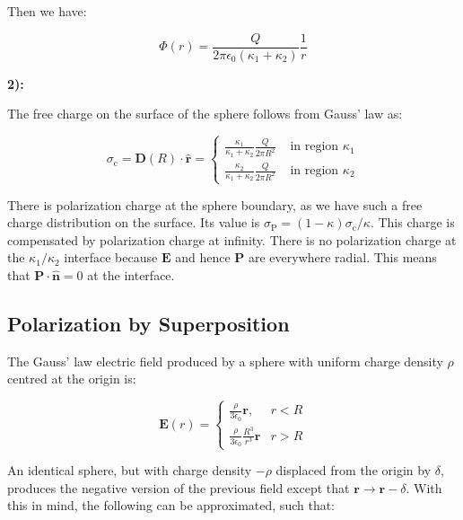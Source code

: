 Then we have:

\begin{equation}
	\Phi(r)=\frac{Q}{2 \pi \epsilon_{0}\left(\kappa_{1}+\kappa_{2}\right)} \frac{1}{r}
\end{equation}

\textbf{2):}

The free charge on the surface of the sphere follows from Gauss' law as:

\begin{equation}
	\sigma_{\mathrm{c}}=\mathbf{D}(R) \cdot \hat{\mathbf{r}}=\left\{\begin{array}{ll}
	\frac{\kappa_{1}}{\kappa_{1}+\kappa_{2}} \frac{Q}{2 \pi R^{2}} & \text { in region } \kappa_{1} \\
	\frac{\kappa_{2}}{\kappa_{1}+\kappa_{2}} \frac{Q}{2 \pi R^{2}} & \text { in region } \kappa_{2}
	\end{array}\right.
\end{equation}

There is polarization charge at the sphere boundary, as we have such a free charge distribution on the surface. Its value is $\sigma_{\mathrm{P}}=(1-\kappa) \sigma_{\mathrm{c}} / \kappa$. This charge is compensated by polarization charge at infinity. There is no polarization charge at the $\kappa_{1} / \kappa_{2}$ interface because $\mathbf{E}$ and hence $\mathbf{P}$ are everywhere radial. This means that $\mathbf{P} \cdot \hat{\mathbf{n}}=0$ at the interface.

\subsection{Polarization by Superposition}\label{Polarization by Superposition}


The Gauss' law electric field produced by a sphere with uniform charge density $\rho$ centred at the origin is:

\begin{equation}
	\mathbf{E}(r)=\left\{\begin{array}{ll}
		\frac{\rho}{3 \epsilon_{0}} \mathbf{r}, & r<R \\
		\frac{\rho}{3 \epsilon_{0}} \frac{R^{3}}{r^{3}} \mathbf{r} & r>R
	\end{array}\right.
\end{equation}

An identical sphere, but with charge density $-\rho$ displaced from the origin by $\delta$, produces the negative version of the previous field except that $\mathbf{r} \rightarrow \mathbf{r}-\delta$. With this in mind, the following can be approximated, such that:

